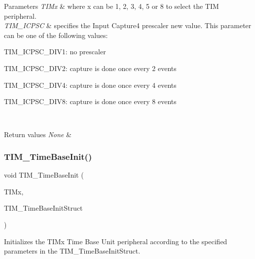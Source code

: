 \begin{DoxyParams}{Parameters}
{\em T\+I\+Mx} & where x can be 1, 2, 3, 4, 5 or 8 to select the T\+IM peripheral. \\
\hline
{\em T\+I\+M\+\_\+\+I\+C\+P\+SC} & specifies the Input Capture4 prescaler new value. This parameter can be one of the following values\+: \begin{DoxyItemize}
\item T\+I\+M\+\_\+\+I\+C\+P\+S\+C\+\_\+\+D\+I\+V1\+: no prescaler \item T\+I\+M\+\_\+\+I\+C\+P\+S\+C\+\_\+\+D\+I\+V2\+: capture is done once every 2 events \item T\+I\+M\+\_\+\+I\+C\+P\+S\+C\+\_\+\+D\+I\+V4\+: capture is done once every 4 events \item T\+I\+M\+\_\+\+I\+C\+P\+S\+C\+\_\+\+D\+I\+V8\+: capture is done once every 8 events \end{DoxyItemize}
\\
\hline
\end{DoxyParams}

\begin{DoxyRetVals}{Return values}
{\em None} & \\
\hline
\end{DoxyRetVals}
\mbox{\label{group___t_i_m___private___functions_ga83fd58c9416802d9638bbe1715c98932}} 
\subsubsection{\texorpdfstring{TIM\_TimeBaseInit()}{TIM\_TimeBaseInit()}}
{\footnotesize\ttfamily void T\+I\+M\+\_\+\+Time\+Base\+Init (\begin{DoxyParamCaption}\item[{\mbox{\hyperlink{struct_t_i_m___type_def}{T\+I\+M\+\_\+\+Type\+Def}} $\ast$}]{T\+I\+Mx,  }\item[{\mbox{\hyperlink{struct_t_i_m___time_base_init_type_def}{T\+I\+M\+\_\+\+Time\+Base\+Init\+Type\+Def}} $\ast$}]{T\+I\+M\+\_\+\+Time\+Base\+Init\+Struct }\end{DoxyParamCaption})}



Initializes the T\+I\+Mx Time Base Unit peripheral according to the specified parameters in the T\+I\+M\+\_\+\+Time\+Base\+Init\+Struct. 


